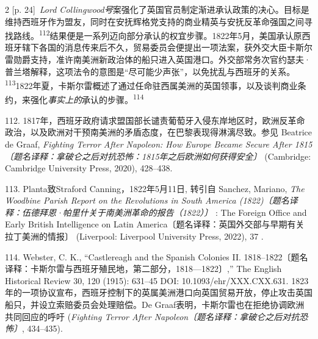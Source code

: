 \documentclass[10pt,a4paper]{article}
\begin{document}
\begin{paracol}{2}
{\scriptsize\color{gray} [p. 24]}\ \textit{Lord Collingwood号}案强化了英国官员制定渐进承认政策的决心。目标是维持西班牙作为盟友，同时在安抚辉格党支持的商业精英与安抚反革命强国之间寻找路\mbox{线。\textsuperscript{112}}结果便是一系列迈向部分承认的权宜步骤。1822年5月，美国承认原西班牙辖下各国的消息传来后不久，贸易委员会便提出一项法案，获外交大臣卡斯尔雷勋爵支持，准许南美洲新政治体的船只进入英国港口。外交部常务次官约瑟夫·普兰塔解释，这项法令的意图是“尽可能少声张”，以免扰乱与西班牙的关\mbox{系。\textsuperscript{113}}1822年夏，卡斯尔雷概述了通过任命驻西属美洲的英国领事，以及谈判商业条约，来强化\textit{事实上的}承认的步\mbox{骤。\textsuperscript{114}}\par{\small 112. 1817年，西班牙政府请求盟国部长谴责葡萄牙入侵东岸地区时，欧洲反革命政治，以及欧洲对干预南美洲的矛盾态度，在巴黎表现得淋漓尽致。参见 Beatrice de Graaf, \textit{Fighting Terror After Napoleon: How Europe Became Secure After 1815〔题名译释：拿破仑之后对抗恐怖：1815年之后欧洲如何获得安全〕} (Cambridge: Cambridge University Press, 2020), 428–438.\par}{\small 113. Planta致Straford Canning，1822年5月11日, 转引自 Sanchez, Mariano, \textit{The Woodbine Parish Report on the Revolutions in South America (1822)〔题名译释：伍德拜恩·帕里什关于南美洲革命的报告（1822）〕} : The Foreign Office and Early British Intelligence on Latin America〔题名译释：英国外交部与早期有关拉丁美洲的情报〕 (Liverpool: Liverpool University Press, 2022), 37 .\par}{\small 114. Webster, C. K., “Castlereagh and the Spanish Colonies II. 1818–1822〔题名译释：卡斯尔雷与西班牙殖民地，第二部分，1818—1822〕,” The English Historical Review 30, 120 (1915): 631–45 DOI: 10.1093/ehr/XXX.CXX.631. 1823年的一项协议宣布，西班牙控制下的英属美洲港口向英国贸易开放，停止攻击英国船只，并设立索赔委员会处理赔偿。De Graaf表明，卡斯尔雷也在拒绝协调欧洲共同回应的呼吁 (\textit{Fighting Terror After Napoleon〔题名译释：拿破仑之后对抗恐怖〕}, 434–435).\par}
\switchcolumn

\end{paracol}
\end{document}
